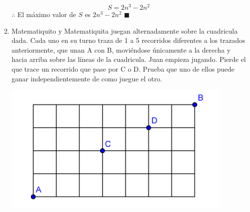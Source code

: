 \documentclass{book}
\begin{document}
\begin{enumerate}
          $$S=2n^3-2n^2$$
          $\therefore$ El máximo valor de $S$ es $2n^3-2n^2$ $\blacksquare$\\
    \item Matematiquito y Matematiquita juegan alternadamente sobre la cuadricula dada. Cada uno en su turno traza de 1 a 5 recorridos diferentes a los trazados anteriormente, que unan A con B, moviéndose únicamente a la derecha y hacia arriba sobre las líneas de la cuadricula. Juan empieza jugando. Pierde el que trace un recorrido que pase por C o D. Prueba que uno de ellos puede ganar independientemente de como juegue el otro.
          \begin{center}
              \includegraphics[scale=1]{imagenes/Combinatoria/13.png}
          \end{center}
          

\end{enumerate}
\end{document}
